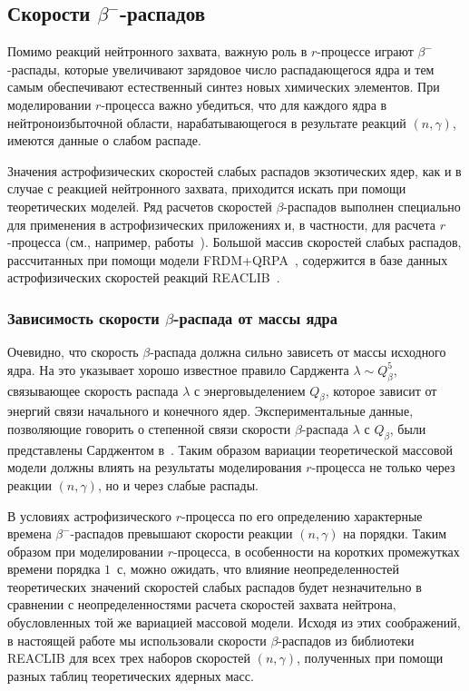 \subsection{Скорости $\beta^-$-распадов} \label{sec:weakfit}
  Помимо реакций нейтронного захвата, важную роль в $r$-процессе играют $\beta^-$-распады, которые увеличивают зарядовое число распадающегося ядра и тем самым обеспечивают естественный синтез новых химических элементов. При моделировании $r$-процесса важно убедиться, что для каждого ядра в нейтроноизбыточной области, нарабатывающегося в результате реакций $(n,\gamma)$, имеются данные о слабом распаде.

Значения астрофизических скоростей слабых распадов экзотических ядер, как и в случае с реакцией нейтронного захвата, приходится искать при помощи теоретических моделей. Ряд расчетов скоростей $\beta$-распадов выполнен специально для применения в астрофизических приложениях и, в частности, для расчета $r$-процесса (см., например, работы~\cite{moller2003,panov2016}). Большой массив скоростей слабых распадов, рассчитанных при помощи модели FRDM+QRPA~\cite{moller2003}, содержится в базе данных астрофизических скоростей реакций REACLIB~\cite{reaclib2010}.

\subsubsection{Зависимость скорости $\beta$-распада от массы ядра}
  Очевидно, что скорость $\beta$-распада должна сильно зависеть от массы исходного ядра. На это указывает хорошо известное правило Сарджента $\lambda \sim Q_\beta^5$, связывающее скорость распада $\lambda$ с энерговыделением $Q_\beta$, которое зависит от энергий связи начального и конечного ядер. Экспериментальные данные, позволяющие говорить о степенной связи скорости $\beta$-распада $\lambda$ с $Q_\beta$, были представлены Сарджентом в~\cite{sargent1933}. Таким образом вариации теоретической массовой модели должны влиять на результаты моделирования $r$-процесса не только через реакции $(n,\gamma)$, но и через слабые распады. 

  В условиях астрофизического $r$-процесса по его определению характерные времена $\beta^-$-распадов превышают скорости реакции $(n,\gamma)$ на порядки. Таким образом при моделировании $r$-процесса, в особенности на коротких промежутках времени порядка $1$~с, можно ожидать, что влияние неопределенностей теоретических значений скоростей слабых распадов будет незначительно в сравнении с неопределенностями расчета скоростей захвата нейтрона, обусловленных той же вариацией массовой модели. Исходя из этих соображений, в настоящей работе мы использовали скорости $\beta$-распадов из библиотеки REACLIB для всех трех наборов скоростей $(n,\gamma)$, полученных при помощи разных таблиц теоретических ядерных масс.

